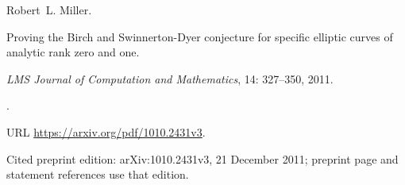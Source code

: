 Robert~L. Miller.

\newblock Proving the {Birch} and {Swinnerton-Dyer} conjecture for specific
  elliptic curves of analytic rank zero and one.

\newblock \emph{LMS Journal of Computation and Mathematics}, 14:
  327--350, 2011.

\newblock {}.

\newblock URL \url{https://arxiv.org/pdf/1010.2431v3}.

\newblock Cited preprint edition: arXiv:1010.2431v3, 21 December 2011; preprint page and statement references use that edition.
